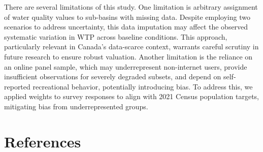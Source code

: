 \documentclass[12pt]{article}
\begin{document}
There are several limitations of this study. One limitation is arbitrary assignment of water quality values to sub-basins with missing data. 
Despite employing two scenarios to address uncertainty, this data imputation may affect the observed systematic variation in WTP across baseline conditions. 
This approach, particularly relevant in Canada’s data-scarce context, warrants careful scrutiny in future research to ensure robust valuation. 
Another limitation is the reliance on an online panel sample, which may underrepresent 
non-internet users, provide insufficient observations for severely degraded subsets, and depend on self-reported recreational behavior, potentially 
introducing bias. To address this, we applied weights to survey responses to align with 2021 Census population targets, mitigating bias from 
underrepresented groups.



\newpage

\section*{References}
\printbibliography[heading=none]
\newpage
\end{document}
